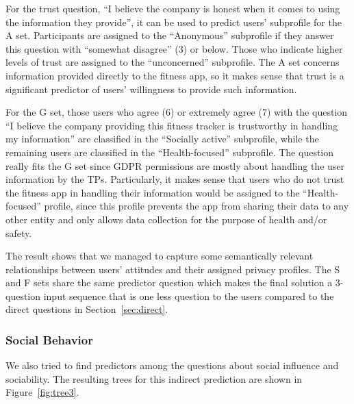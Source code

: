 
For the trust question, ``I believe the company is honest when it comes to using the information they provide'', it can be used to predict users' subprofile for the A set. Participants are assigned to the ``Anonymous'' subprofile if they answer this question with ``somewhat disagree'' (3) or below. Those who indicate higher levels of trust are assigned to the ``unconcerned'' subprofile. The A set concerns information provided directly to the fitness app, so it makes sense that trust is a significant predictor of users' willingness to provide such information.

For the G set, those users who agree (6) or extremely agree (7) with the question ``I believe the company providing this fitness tracker is trustworthy in handling my information'' are classified in the ``Socially active'' subprofile, while the remaining users are classified in the ``Health-focused'' subprofile. The question really fits the G set since GDPR permissions are mostly about handling the user information by the TPs. Particularly, it makes sense that users who do not trust the fitness app in handling their information would be assigned to the ``Health-focused'' profile, since this profile prevents the app from sharing their data to any other entity and only allows data collection for the purpose of health and/or safety.



The result shows that we managed to capture some semantically relevant relationships between users' attitudes and their assigned privacy profiles. The S and F sets share the same predictor question which makes the final solution a 3-question input sequence that is one less question to the users compared to the direct questions in Section~\ref{sec:direct}.

\subsubsection{Social Behavior}
We also tried to find predictors among the questions about social influence and sociability. The resulting trees for this indirect prediction are shown in Figure~\ref{fig:tree3}.



